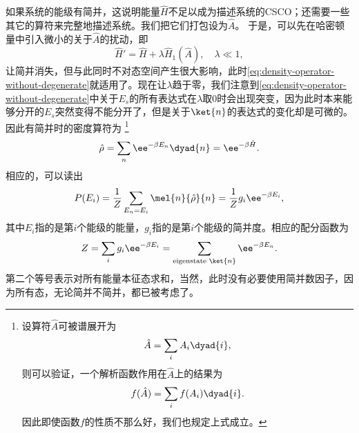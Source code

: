 如果系统的能级有简并，这说明能量$\hat{H}$不足以成为描述系统的CSCO；还需要一些其它的算符来完整地描述系统。我们把它们打包设为$\hat{A}$。
于是，可以先在哈密顿量中引入微小的关于$\hat{A}$的扰动，即
\[
    \hat{H}' = \hat{H} + \lambda \hat{H}_1 (\hat{A}), \quad \lambda \ll 1,
\]
让简并消失，但与此同时不对态空间产生很大影响，此时\eqref{eq:density-operator-without-degenerate}就适用了。现在让$\lambda$趋于零，我们注意到\eqref{eq:density-operator-without-degenerate}中关于$E_s$的所有表达式在$\lambda$取0时会出现突变，因为此时本来能够分开的$E_s$突然变得不能分开了，但是关于$\ket{n}$的表达式的变化却是可微的。
因此有简并时的密度算符为%
\footnote{设算符$\hat{A}$可被谱展开为
\[
    \hat{A} = \sum_i A_i \dyad{i},
\]
则可以验证，一个解析函数作用在$\hat{A}$上的结果为
\[
    f(\hat{A}) = \sum_i f(A_i) \dyad{i}.
\]
因此即使函数$f$的性质不那么好，我们也规定上式成立。
}
\begin{equation}
    \hat{\rho} = \sum_n \ee^{-\beta E_n} \dyad{n} = \ee^{-\beta \hat{H}}.
    \label{eq:gibbs-density-operator}
\end{equation}
相应的，可以读出
\begin{equation}
    P(E_i) = \frac{1}{Z} \sum_{E_n = E_i} \mel{n}{\hat{\rho}}{n} = \frac{1}{Z} g_i \ee^{-\beta E_i},
\end{equation}
其中$E_i$指的是第$i$个能级的能量，$g_i$指的是第$i$个能级的简并度。相应的配分函数为
\begin{equation}
    Z = \sum_i g_i \ee^{- \beta E_i} = \sum_\text{eigenstate $\ket{n}$} \ee^{- \beta E_n} .
\end{equation}
第二个等号表示对所有能量本征态求和，当然，此时没有必要使用简并数因子，因为所有态，无论简并不简并，都已被考虑了。

